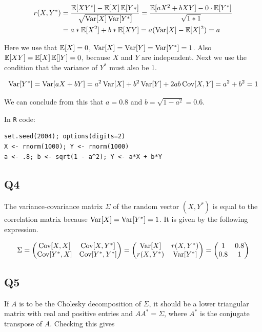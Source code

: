 \begin{align*}
r(X, Y^*) & = \frac{\operatorname{\mathbb{E}}[X Y^*] - \operatorname{\mathbb{E}}[X] \operatorname{\mathbb{E}}[Y*]}{\sqrt{\operatorname{\text{Var}}[X] \operatorname{\text{Var}}[Y^*]}} = \frac{\operatorname{\mathbb{E}}[a X^2 + b X Y] - 0 \cdot \operatorname{\mathbb{E}}[Y^*]}{\sqrt{1 * 1}} \\
          & = a * \operatorname{\mathbb{E}}[X^2] + b * \operatorname{\mathbb{E}}[X Y] = a (\operatorname{\text{Var}}[X] - \operatorname{\mathbb{E}}[X]^2) = a
\end{align*}

Here we use that $\operatorname{\mathbb{E}}[X] = 0$, $\operatorname{\text{Var}}[X] = \operatorname{\text{Var}}[Y] = \operatorname{\text{Var}}[Y^*] = 1$. Also $\operatorname{\mathbb{E}}[X Y] = \operatorname{\mathbb{E}}[X] \operatorname{\mathbb{E}}[]Y] = 0$, because $X$ and $Y$ are independent.
Next we use the condition that the variance of $Y^*$ must also be 1.

\begin{displaymath}
\operatorname{\text{Var}}[Y^*] = \operatorname{\text{Var}}[aX + bY] = a^2 \operatorname{\text{Var}}[X] + b^2 \operatorname{\text{Var}}[Y] + 2ab \operatorname{\text{Cov}}[X,Y] = a^2 + b^2 = 1
\end{displaymath}

We can conclude from this that $a = 0.8$ and $b = \sqrt{1 - a^2} = 0.6$.

In \verb|R| code:

\begin{verbatim}
set.seed(2004); options(digits=2)
X <- rnorm(1000); Y <- rnorm(1000)
a <- .8; b <- sqrt(1 - a^2); Y <- a*X + b*Y
\end{verbatim}

\subsection*{Q4}

The variance-covariance matrix $\Sigma$ of the random vector $(X, Y^*)$ is equal to the correlation matrix because $\operatorname{\text{Var}}[X] = \operatorname{\text{Var}}[Y^*] = 1$. It is given by the following expression.

\begin{displaymath}
\Sigma = 
\begin{pmatrix}
\operatorname{\text{Cov}}[X,X] & \operatorname{\text{Cov}}[X, Y^*] \\
\operatorname{\text{Cov}}[Y^*,X] & \operatorname{\text{Cov}}[Y^*, Y^*]
\end{pmatrix}
=
\begin{pmatrix}
\operatorname{\text{Var}}[X] & r(X,Y^*) \\
r(X, Y^*) & \operatorname{\text{Var}}[Y^*]
\end{pmatrix}
=
\begin{pmatrix}
1 & 0.8 \\
0.8 & 1
\end{pmatrix}
\end{displaymath}

\subsection*{Q5}
If $A$ is to be the Cholesky decomposition of $\Sigma$, it should be a lower triangular matrix with real and positive entries and $A A^* = \Sigma$, where $A^*$ is the conjugate transpose of $A$. Checking this gives

